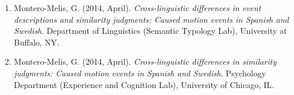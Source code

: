 \documentclass[margin, 11pt]{res} %
\begin{document}
\begin{resume}
\begin{enumerate}
\item Montero-Melis, G. (2014, April). \textit{Cross-linguistic differences in event descriptions and similarity judgments: Caused motion events in Spanish and Swedish}. Department of Linguistics (Semantic Typology Lab), University at Buffalo, NY.

\item Montero-Melis, G. (2014, April). \textit{Cross-linguistic differences in similarity judgments: Caused motion events in Spanish and Swedish}. Psychology Department (Experience and Cognition Lab), University of Chicago, IL.

\end{enumerate}



%
%
%
%
%
%
%





\end{resume}
\end{document}
